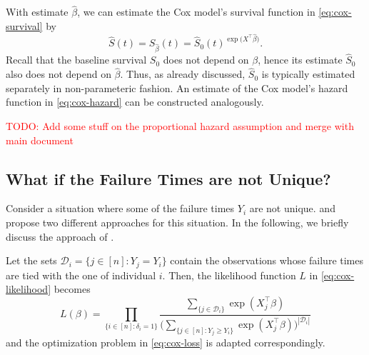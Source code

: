 \documentclass[11pt]{article}
\begin{document}
With estimate $\widehat{\beta}$, we can estimate the Cox model's survival function in \eqref{eq:cox-survival} by
\[
    \widehat{S}(t) = S_{\widehat{\beta}}(t)
    =
    \widehat{S}_0(t)^{\exp\big(X^\top \widehat{\beta}\big)}.
\]
Recall that the baseline survival $S_0$ does not depend on $\beta$, hence its estimate $\widehat{S}_0$ also does not depend on $\widehat{\beta}$. Thus, as already discussed, $\widehat{S}_0$ is typically estimated separately in non-parameteric fashion. An estimate of the Cox model's hazard function in \eqref{eq:cox-hazard} can be constructed analogously.

\textcolor{red}{TODO: Add some stuff on the proportional hazard assumption and merge with main document}

\subsection{What if the Failure Times are not Unique?} \label{sec:non-unique-times}
Consider a situation where some of the failure times $Y_i$ are not unique. \cite{breslow1975} and \cite{efron1977} propose two different approaches for this situation. In the following, we briefly discuss the approach of \cite{breslow1975}.

Let the sets $\mathcal{D}_i = \{ j \in [n] : Y_j = Y_i \}$ contain the observations whose failure times are tied with the one of individual $i$. Then, the likelihood function $L$ in \eqref{eq:cox-likelihood} becomes
\begin{equation*} 
        L(\beta)
        =
        \prod_{\{ i \in [n] : \delta_i = 1 \}}
        \frac{ \sum_{\{j\in \mathcal{D}_i\}}\exp(X_j^\top \beta) }{ \Big( \sum_{\{ j\in[n] : Y_j \geq Y_i \}} \exp(X_j^\top \beta) \Big)^{|\mathcal{D}_i|} }
\end{equation*}
and the optimization problem in \ref{eq:cox-loss} is adapted correspondingly.


\end{document}
